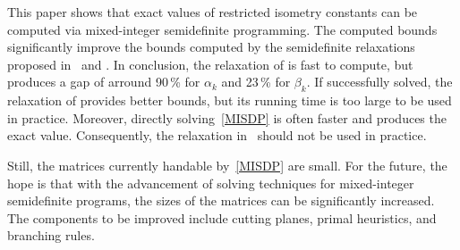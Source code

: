 \documentclass[journal]{IEEEtran}
\begin{document}
\noindent
This paper shows that exact values of restricted isometry constants can be
computed via mixed-integer semidefinite programming. The computed bounds
significantly improve the bounds computed by the semidefinite relaxations
proposed in~\cite{Asp07} and \cite{Asp08}. In conclusion, the relaxation of
\cite{Asp07} is fast to compute, but produces a gap of arround 90\,\% for
$\alpha_k$ and 23\,\% for $\beta_k$. If successfully solved, the relaxation
of \cite{Asp08} provides better bounds, but its running time is too large
to be used in practice. Moreover, directly solving~\eqref{MISDP} is often
faster and produces the exact value. Consequently, the relaxation
in~\cite{Asp08} should not be used in practice.

Still, the matrices currently handable by~\eqref{MISDP} are small. For the
future, the hope is that with the advancement of solving techniques for
mixed-integer semidefinite programs, the sizes of the matrices can be
significantly increased. The components to be improved include cutting
planes, primal heuristics, and branching rules.



\end{document}
